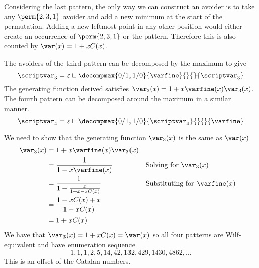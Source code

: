 Considering the last pattern, the only way we can construct an
avoider is to take any \(\perm{2,3,1}\) avoider and add a new minimum
at the start of the permutation. Adding a new leftmost point in any other
position would either create an occurrence of \(\perm{2,3,1}\) or the pattern.
Therefore this is also counted by \(\var(x) = 1+xC(x)\).

The avoiders of the third pattern can be decomposed by the maximum
to give
\begin{equation*}
    \scriptvar_3 = \varepsilon \sqcup
    \decompmax{0/1,1/0}{\mathcal{\varfine}}{}{}{\scriptvar_3}
\end{equation*}
The generating function derived satisfies \(\var_3(x) = 1 + x\varfine(x)\var_3(x)\).
The fourth pattern can be decomposed around the maximum in a similar
manner.
\begin{equation*}
    \scriptvar_4 = \varepsilon \sqcup
    \decompmax{0/1,1/0}{\scriptvar_4}{}{}{\mathcal{\varfine}}
\end{equation*}

We need to show that the generating function \(\var_3(x)\) is the same as \(\var(x)\)
\begin{equation*}
    \begin{aligned}
        \var_3(x) &= 1 + x\varfine(x)\var_3(x) \\
        &= \frac{1}{1-x\varfine(x)} && \text{Solving for \(\var_3(x)\)}\\
        &= \frac{1}{1 - \frac{x}{1+x-xC(x)}} &&\text{Substituting for \(\varfine(x)\)}\\
        &= \frac{1-xC(x) +x}{1-xC(x)}\\
        &= 1+xC(x)
    \end{aligned}
\end{equation*}
We have that \(\var_3(x) = 1+xC(x)= \var(x) \) so all four patterns are Wilf-equivalent
 and have enumeration sequence
 \begin{equation*}
     1, 1, 1, 2, 5, 14, 42, 132, 429, 1430, 4862,\dotsc
 \end{equation*}
 This is an offset of the Catalan numbers.

